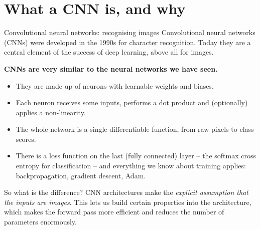 \documentclass[10pt,aspectratio=169]{beamer}
\begin{document}
\section{What a CNN is, and why}
\begin{frame}{Convolutional neural networks: recognising images}
\small
Convolutional neural networks (CNNs) were developed in the 1990s for
character recognition.  Today they are a central element of the success of
deep learning, above all for images.

\medskip
\textbf{CNNs are very similar to the neural networks we have seen.}
\begin{itemize}
  \item They are made up of neurons with learnable weights and biases.
  \item Each neuron receives some inputs, performs a dot product and
        (optionally) applies a non-linearity.
  \item The whole network is a single differentiable function, from raw
        pixels to class scores.
  \item There is a loss function on the last (fully connected) layer --
        the softmax cross entropy for classification -- and everything we
        know about training applies: backpropagation, gradient descent, Adam.
\end{itemize}

\medskip
\begin{block}{So what is the difference?}
CNN architectures make the \emph{explicit assumption that the inputs are
images}.  This lets us build certain properties into the architecture,
which makes the forward pass more efficient and reduces the number of
parameters enormously.
\end{block}
\end{frame}
\end{document}
